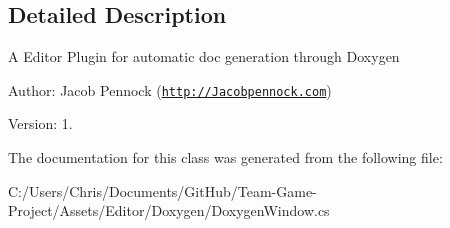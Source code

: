 \subsection{Detailed Description}


A Editor Plugin for automatic doc generation through Doxygen

Author\+: Jacob Pennock (\href{http://Jacobpennock.com}{\tt http\+://\+Jacobpennock.\+com})

Version\+: 1.

The documentation for this class was generated from the following file\+:\begin{DoxyCompactItemize}
\item 
C\+:/\+Users/\+Chris/\+Documents/\+Git\+Hub/\+Team-\/\+Game-\/\+Project/\+Assets/\+Editor/\+Doxygen/Doxygen\+Window.\+cs\end{DoxyCompactItemize}
